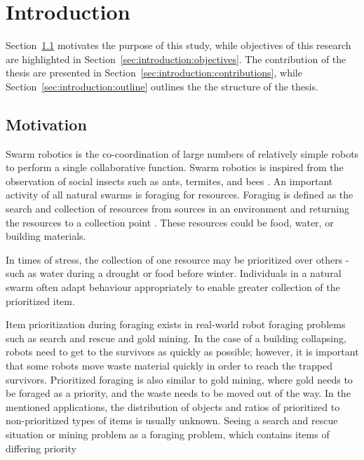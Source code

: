
\chapter{Introduction}
\label{chap:introduction}
\pagestyle{headings}
\setcounter{page}{1}


Section~\ref{sec:introduction:motivation} motivates the purpose of this study, while objectives of this research are highlighted in Section~\ref{sec:introduction:objectives}. The contribution of the thesis are presented in Section~\ref{sec:introduction:contributions}, while Section~\ref{sec:introduction:outline} outlines the the structure of the thesis.

\section{Motivation}
\label{sec:introduction:motivation}

Swarm robotics is the co-coordination of large numbers of  relatively simple robots to perform a single collaborative function. Swarm robotics is inspired from the observation of social insects such as ants, termites, and bees \cite{dorigo2004swarm}. An important activity of all natural swarms is foraging for resources. Foraging is defined as the search and collection of resources from sources in an environment and returning the resources to a collection point \cite{winfield2009foraging}. These resources could be food, water, or building materials. %

In times of stress, the collection of one resource may be prioritized over others - such as water during a drought or food before winter. Individuals in a natural swarm often adapt behaviour appropriately to enable greater collection of the prioritized item.

Item prioritization during foraging exists in real-world robot foraging problems such as search and rescue and gold mining. In the case of a building collapsing, robots need to get to the survivors as quickly as possible; however, it is important that some robots move waste material quickly in order to reach the trapped survivors. Prioritized foraging is also similar to gold mining, where gold needs to be foraged as a priority, and the waste needs to be moved out of the way. In the mentioned applications, the distribution of objects and ratios of prioritized to non-prioritized types of items is usually unknown. Seeing a search and rescue situation or mining problem as a foraging problem, which contains items of differing priority 


